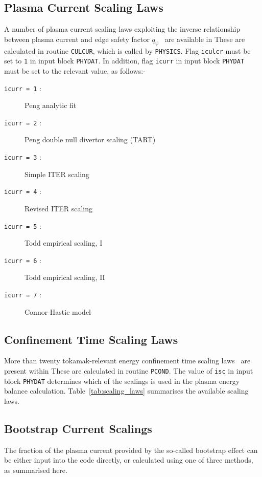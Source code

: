 \subsection{Plasma Current Scaling Laws}

A number of plasma current scaling laws exploiting the inverse relationship
between plasma current and edge safety factor $q_{\psi}$~\cite{172} are
available in \PSD These are calculated in routine {\tt CULCUR}, which is
called by {\tt PHYSICS}.  Flag {\tt iculcr} must be set to {\tt 1} in input
block {\tt PHYDAT}. In addition, flag {\tt icurr} in input block {\tt PHYDAT}
must be set to the relevant value, as follows:-
\begin{description}
\item [{\tt icurr = 1} :] Peng analytic fit
\item [{\tt icurr = 2} :] Peng double null divertor scaling (TART)
\item [{\tt icurr = 3} :] Simple ITER scaling
\item [{\tt icurr = 4} :] Revised ITER scaling
\item [{\tt icurr = 5} :] Todd empirical scaling, I
\item [{\tt icurr = 6} :] Todd empirical scaling, II
\item [{\tt icurr = 7} :] Connor-Hastie model
\end{description}

\subsection{Confinement Time Scaling Laws}

More than twenty tokamak-relevant energy confinement time scaling
laws~\cite{IPDG,172,H90P,iter93h} are present within \PSD These are calculated
in routine {\tt PCOND}. The value of {\tt isc} in input block {\tt PHYDAT}
determines which of the scalings is used in the plasma energy balance
calculation.  Table~\ref{tab:scaling_laws} summarises the available scaling
laws.


\subsection{Bootstrap Current Scalings}

The fraction of the plasma current provided by the so-called bootstrap effect
can be either input into the code directly, or calculated using one of three
methods, as summarised here.

